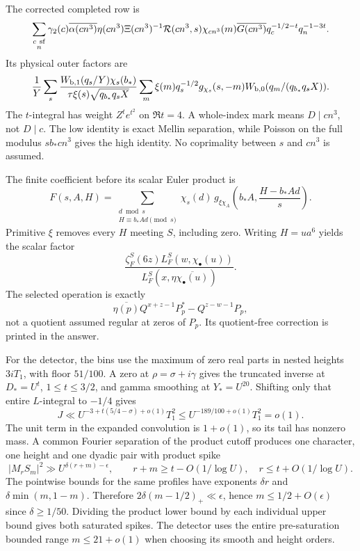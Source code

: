 \documentclass[12pt]{article}
\begin{document}
The corrected completed row is
\[
 \sum_{\substack{c\ {\rm sf}\\n}}
 \gamma_2(c)\overline{\alpha(cn^3)}
 \eta(cn^3)\Xi(cn^3)^{-1}\mathcal R(cn^3,s)
 \chi_{cn^3}(m)\overline{G(cn^3)}
 q_c^{-1/2-t}q_n^{-1-3t}.
\]
Its physical outer factors are
\[
 \frac1Y\sum_s
 \frac{W_{\rm b,1}(q_s/Y)\chi_s(b_*)}{\tau\xi(s)\sqrt{q_{b_*}q_sX}}
 \sum_m \xi(m)q_s^{-1/2}g_{\chi_s}(s,-m)
           W_{\rm b,0}(q_m/(q_{b_*}q_sX)).
\]
The \(t\)-integral has weight \(Z^t e^{t^2}\) on \(\Re t=4\).
A whole-index mark means \(D\mid cn^3\), not \(D\mid c\).
The low identity is exact Mellin separation, while Poisson on the
full modulus \(sb_*cn^3\) gives the high identity.  No coprimality
between \(s\) and \(cn^3\) is assumed.

The finite coefficient before its scalar Euler product is
\[
 F(s,A,H)=
 \sum_{\substack{d\bmod s\\H\equiv b_*Ad\pmod s}}
       \chi_s(d)\,g_{\xi\chi_A}\!
                \left(b_*A,\frac{H-b_*Ad}{s}\right).
\]
Primitive \(\xi\) removes every \(H\) meeting \(S\), including zero.
Writing \(H=ua^6\) yields the scalar factor
\[
 \frac{\zeta_F^S(6z)L_F^S(w,\chi_\bullet(u))}
              {L_F^S(x,\eta\overline{\chi_\bullet(u)})}.
\]
The selected operation is exactly
\[
 \overline{\eta(p)}Q^{x+z-1}P_p^*-Q^{z-w-1}P_p,
\]
not a quotient assumed regular at zeros of \(P_p\).
Its quotient-free correction is printed in the answer.

For the detector, the bins use the maximum of zero real parts in
nested heights \(3iT_1\), with floor \(51/100\).
A zero at \(\rho=\sigma+i\gamma\) gives the truncated inverse
at \(D_*=U^t\), \(1\le t\le3/2\), and gamma smoothing at
\(Y_*=U^{20}\).
Shifting only that entire \(L\)-integral to \(-1/4\) gives
\[
 J\ll U^{-3+t(5/4-\sigma)+o(1)}T_1^2
      \le U^{-189/100+o(1)}T_1^2=o(1).
\]
The unit term in the expanded convolution is \(1+o(1)\), so its
tail has nonzero mass.  A common Fourier separation of the product
cutoff produces one character, one height and one dyadic pair
with product spike
\[
 |M_rS_m|^2\gg U^{\delta(r+m)-\epsilon},
 \qquad r+m\ge t-O(1/\log U),\quad r\le t+O(1/\log U).
\]
The pointwise bounds for the same profiles have exponents
\(\delta r\) and \(\delta\min(m,1-m)\).
Therefore \(2\delta(m-1/2)_+\ll\epsilon\), hence
\(m\le1/2+O(\epsilon)\) since \(\delta\ge1/50\).
Dividing the product lower bound by each individual upper bound
gives both saturated spikes.  The detector uses the entire
pre-saturation bounded range \(m\le21+o(1)\) when choosing its
smooth and height orders.
\end{document}
